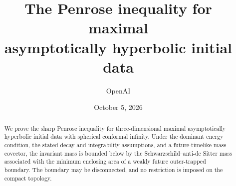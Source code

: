 \documentclass[11pt]{article}
\title{The Penrose inequality for maximal\\asymptotically hyperbolic initial data}
\author{OpenAI}
\date{October 5, 2026}
\begin{document}
\maketitle
\begin{abstract}
We prove the sharp Penrose inequality for three-dimensional maximal
asymptotically hyperbolic initial data with spherical conformal infinity.
Under the dominant energy condition, the stated decay and integrability
assumptions, and a future-timelike mass covector, the invariant mass is bounded below
by the Schwarzschild--anti-de Sitter mass associated with the minimum
enclosing area of a weakly future outer-trapped boundary.
The boundary may be disconnected, and no restriction is imposed on the
compact topology.
\end{abstract}
\tableofcontents












\end{document}
